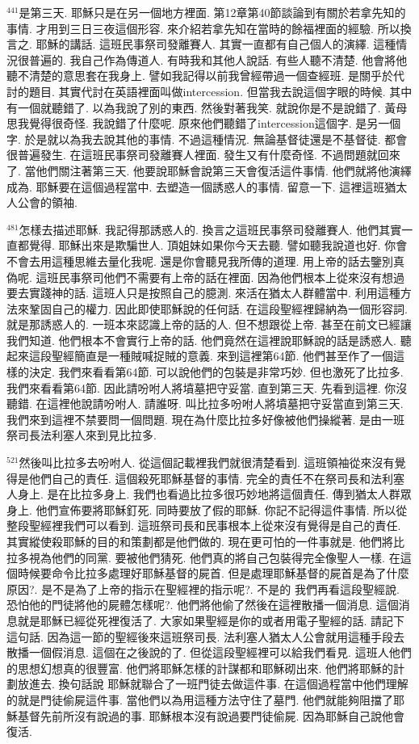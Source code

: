 \documentclass{book}
\begin{document}
$^{441}$是第三天.
耶穌只是在另一個地方裡面.
第12章第40節談論到有關於若拿先知的事情.
才用到三日三夜這個形容.
來介紹若拿先知在當時的餘福裡面的經驗.
所以換言之.
耶穌的講話.
這班民事祭司發離賽人.
其實一直都有自己個人的演繹.
這種情況很普遍的.
我自己作為傳道人.
有時我和其他人說話.
有些人聽不清楚.
他會將他聽不清楚的意思套在我身上.
譬如我記得以前我曾經帶過一個查經班.
是關乎於代討的題目.
其實代討在英語裡面叫做intercession.
但當我去說這個字眼的時候.
其中有一個就聽錯了.
以為我說了別的東西.
然後對著我笑.
就說你是不是說錯了.
黃母思我覺得很奇怪.
我說錯了什麼呢.
原來他們聽錯了intercession這個字.
是另一個字.
於是就以為我去說其他的事情.
不過這種情況.
無論基督徒還是不基督徒.
都會很普遍發生.
在這班民事祭司發離賽人裡面.
發生又有什麼奇怪.
不過問題就回來了.
當他們關注著第三天.
他要說耶穌會說第三天會復活這件事情.
他們就將他演繹成為.
耶穌要在這個過程當中.
去塑造一個誘惑人的事情.
留意一下.
這裡這班猶太人公會的領袖.

$^{481}$怎樣去描述耶穌.
我記得那誘惑人的.
換言之這班民事祭司發離賽人.
他們其實一直都覺得.
耶穌出來是欺騙世人.
頂姐妹如果你今天去聽.
譬如聽我說道也好.
你會不會去用這種思維去量化我呢.
還是你會聽見我所傳的道理.
用上帝的話去鑒別真偽呢.
這班民事祭司他們不需要有上帝的話在裡面.
因為他們根本上從來沒有想過要去實踐神的話.
這班人只是按照自己的臆測.
來活在猶太人群體當中.
利用這種方法來鞏固自己的權力.
因此即使耶穌說的任何話.
在這段聖經裡歸納為一個形容詞.
就是那誘惑人的.
一班本來認識上帝的話的人.
但不想跟從上帝.
甚至在前文已經讓我們知道.
他們根本不會實行上帝的話.
他們竟然在這裡說耶穌說的話是誘惑人.
聽起來這段聖經簡直是一種賊喊捉賊的意義.
來到這裡第64節.
他們甚至作了一個這樣的決定.
我們來看看第64節.
可以說他們的包裝是非常巧妙.
但也激死了比拉多.
我們來看看第64節.
因此請吩咐人將墳墓把守妥當.
直到第三天.
先看到這裡.
你沒聽錯.
在這裡他說請吩咐人.
請誰呀.
叫比拉多吩咐人將墳墓把守妥當直到第三天.
我們來到這裡不禁要問一個問題.
現在為什麼比拉多好像被他們操縱著.
是由一班祭司長法利塞人來到見比拉多.

$^{521}$然後叫比拉多去吩咐人.
從這個記載裡我們就很清楚看到.
這班領袖從來沒有覺得是他們自己的責任.
這個殺死耶穌基督的事情.
完全的責任不在祭司長和法利塞人身上.
是在比拉多身上.
我們也看過比拉多很巧妙地將這個責任.
傳到猶太人群眾身上.
他們宣佈要將耶穌釘死.
同時要放了假的耶穌.
你記不記得這件事情.
所以從整段聖經裡我們可以看到.
這班祭司長和民事根本上從來沒有覺得是自己的責任.
其實縱使殺耶穌的目的和策劃都是他們做的.
現在更可怕的一件事就是.
他們將比拉多視為他們的同黨.
要被他們猜死.
他們真的將自己包裝得完全像聖人一樣.
在這個時候要命令比拉多處理好耶穌基督的屍首.
但是處理耶穌基督的屍首是為了什麼原因?.
是不是為了上帝的指示在聖經裡的指示呢?.
不是的 我們再看這段聖經說.
恐怕他的門徒將他的屍體怎樣呢?.
他們將他偷了然後在這裡散播一個消息.
這個消息就是耶穌已經從死裡復活了.
大家如果聖經是你的或者用電子聖經的話.
請記下這句話.
因為這一節的聖經後來這班祭司長.
法利塞人猶太人公會就用這種手段去散播一個假消息.
這個在之後說的了.
但從這段聖經裡可以給我們看見.
這班人他們的思想幻想真的很豐富.
他們將耶穌怎樣的計謀都和耶穌砌出來.
他們將耶穌的計劃放進去.
換句話說 耶穌就聯合了一班門徒去做這件事.
在這個過程當中他們理解的就是門徒偷屍這件事.
當他們以為用這種方法守住了墓門.
他們就能夠阻擋了耶穌基督先前所沒有說過的事.
耶穌根本沒有說過要門徒偷屍.
因為耶穌自己說他會復活.
\end{document}
